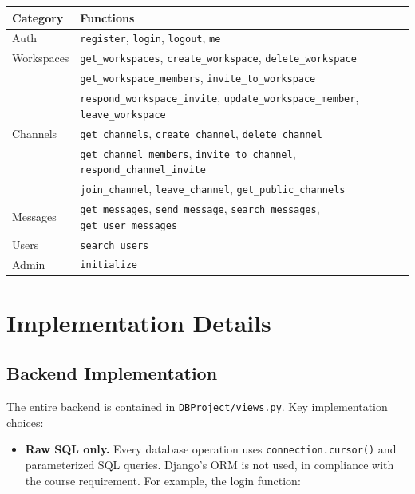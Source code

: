\documentclass[11pt]{article}
\begin{document}
\begin{center}
\small
\begin{tabular}{ll}
\toprule
Category & Functions \\
\midrule
Auth & \texttt{register}, \texttt{login}, \texttt{logout}, \texttt{me} \\
Workspaces & \texttt{get\_workspaces}, \texttt{create\_workspace}, \texttt{delete\_workspace} \\
 & \texttt{get\_workspace\_members}, \texttt{invite\_to\_workspace} \\
 & \texttt{respond\_workspace\_invite}, \texttt{update\_workspace\_member}, \texttt{leave\_workspace} \\
Channels & \texttt{get\_channels}, \texttt{create\_channel}, \texttt{delete\_channel} \\
 & \texttt{get\_channel\_members}, \texttt{invite\_to\_channel}, \texttt{respond\_channel\_invite} \\
 & \texttt{join\_channel}, \texttt{leave\_channel}, \texttt{get\_public\_channels} \\
Messages & \texttt{get\_messages}, \texttt{send\_message}, \texttt{search\_messages}, \texttt{get\_user\_messages} \\
Users & \texttt{search\_users} \\
Admin & \texttt{initialize} \\
\bottomrule
\end{tabular}
\end{center}


\newpage
\section{Implementation Details}
\label{sec:impl}

\subsection{Backend Implementation}

The entire backend is contained in \texttt{DBProject/views.py}. Key implementation choices:

\begin{itemize}
    \item \textbf{Raw SQL only.} Every database operation uses \texttt{connection.cursor()} and parameterized SQL queries. Django's ORM is not used, in compliance with the course requirement. For example, the login function:
\end{itemize}
\end{document}
